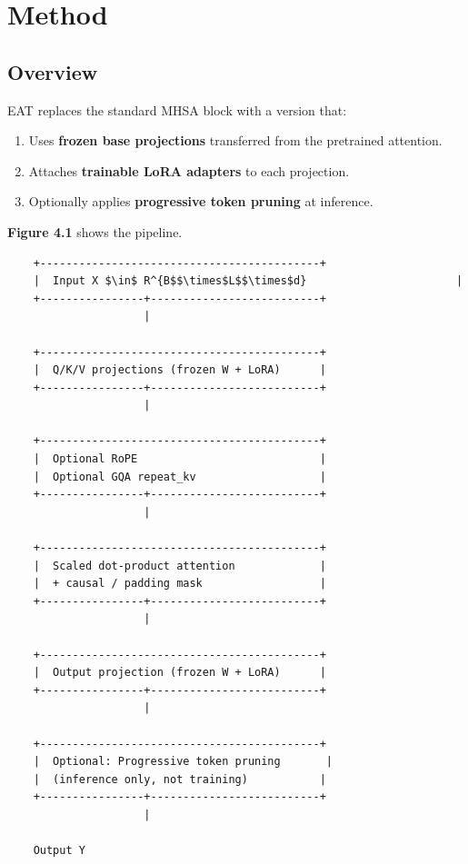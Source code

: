 
\section{Method}

\subsection{Overview}

EAT replaces the standard MHSA block with a version that:

\begin{enumerate}
\item Uses \textbf{frozen base projections} transferred from the pretrained attention.
\item Attaches \textbf{trainable LoRA adapters} to each projection.
\item Optionally applies \textbf{progressive token pruning} at inference.

\end{enumerate}
\textbf{Figure 4.1} shows the pipeline.

\begin{lstlisting}
    +-------------------------------------------+
    |  Input X $\in$ R^{B$$\times$L$$\times$d}                       |
    +----------------+--------------------------+
                     |
                      
    +-------------------------------------------+
    |  Q/K/V projections (frozen W + LoRA)      |
    +----------------+--------------------------+
                     |
                      
    +-------------------------------------------+
    |  Optional RoPE                            |
    |  Optional GQA repeat_kv                   |
    +----------------+--------------------------+
                     |
                      
    +-------------------------------------------+
    |  Scaled dot-product attention             |
    |  + causal / padding mask                  |
    +----------------+--------------------------+
                     |
                      
    +-------------------------------------------+
    |  Output projection (frozen W + LoRA)      |
    +----------------+--------------------------+
                     |
                      
    +-------------------------------------------+
    |  Optional: Progressive token pruning       |
    |  (inference only, not training)           |
    +----------------+--------------------------+
                     |
                      
    Output Y
\end{lstlisting}

